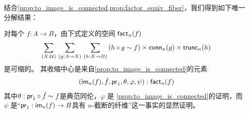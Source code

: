 
结合\cref{prop:to_image_is_connected,prop:factor_equiv_fiber}，我们得到如下唯一分解结果：

\begin{thm}\label{thm:orth-fact}
对每个 $f:A\to B$，由下式定义的空间 $\mathsf{fact}_n(f)$
\begin{equation*}
\sm{X:\type}{g:A\to X}{h:X\to B} (h\circ g\htpy f)\times\mathsf{conn}_n(g)\times\mathsf{trunc}_n(h)
\end{equation*}
是可缩的。
其收缩中心是来自\cref{prop:to_image_is_connected}的元素
\begin{equation*}
{\mathopen{}(\ensuremath{\mathsf{im}}_n(f),\tilde{f},\ensuremath{\mathsf{pr}_{1}},\theta,\varphi,\psi)\mathclose{}}:\mathsf{fact}_n(f)
\end{equation*}
其中$\theta:\mathsf{pr}_{1}\circ\tilde{f}\sim f$是典范同伦，$\varphi$ 是
\cref{prop:to_image_is_connected}的证明，而 $\psi$ 是``$\mathsf{pr}_{1}:\mathsf{im}_n(f)\to B$具有 $n$-截断的纤维''这一事实的显然证明。
\end{thm}

